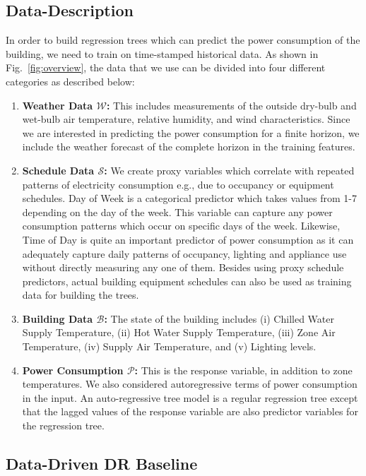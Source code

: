 \subsection{Data-Description}

In order to build regression trees which can predict the power consumption of the building, we need to train on time-stamped historical data. As shown in Fig.~\ref{fig:overview}, the data that we use can be divided into four different categories as described below:
\begin{enumerate}
\item \textbf{Weather Data $\mathcal{W}$:} This includes measurements of the outside dry-bulb and wet-bulb air temperature, relative humidity, and wind characteristics. Since we are interested in predicting the power consumption for a finite horizon, we include the weather forecast of the complete horizon in the training features.
\item \textbf{Schedule Data $\mathcal{S}$:} We create proxy variables which correlate with repeated patterns of electricity consumption e.g., due to occupancy or equipment schedules. Day of Week is a categorical predictor which takes values from 1-7 depending on the day of the week. This variable can capture any power consumption patterns which occur on specific days of the week. Likewise, Time of Day is quite an important predictor of power consumption as it can adequately capture daily patterns of occupancy, lighting and appliance use without directly measuring any one of them. Besides using proxy schedule predictors, actual building equipment schedules can also be used as training data for building the trees.
\item \textbf{Building Data $\mathcal{B}$:} The state of the building includes (i) Chilled Water Supply Temperature, (ii) Hot Water Supply Temperature, (iii) Zone Air Temperature, (iv) Supply Air Temperature, and (v) Lighting levels.
\item \textbf{Power Consumption $\mathcal{P}$:} This is the response variable, in addition to zone temperatures. We also considered autoregressive terms of power consumption in the input. 
An auto-regressive tree model is a regular regression tree except that the lagged values of the response variable are also predictor variables for the regression tree.
\end{enumerate}

\subsection{Data-Driven DR Baseline}


